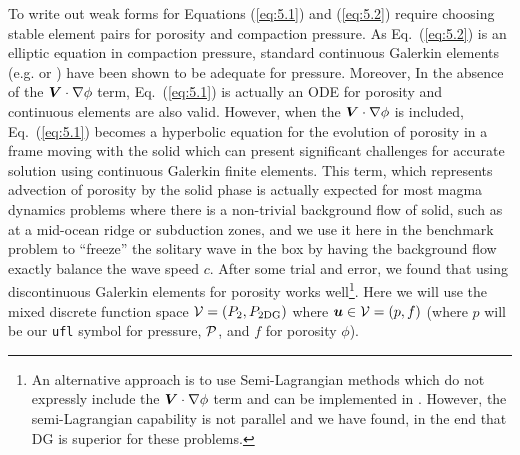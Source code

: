 To write out weak forms for Equations (\ref{eq:5.1}) and
(\ref{eq:5.2}) require choosing stable element pairs for porosity and
compaction pressure.  As Eq.\ (\ref{eq:5.2}) is an elliptic equation
in compaction pressure, standard continuous Galerkin elements (e.g. \Pone
or \Ptwo) have been shown to be adequate for pressure.  Moreover, In the
absence of the ${\mbox{\boldmath$V$}}\cdot\nabla\phi$ term, Eq.\ (\ref{eq:5.1}) is
actually an ODE for porosity and continuous elements are also valid.
However, when the ${\mbox{\boldmath$V$}}\cdot\nabla\phi$ is included, Eq.\ (\ref{eq:5.1})
becomes a hyperbolic equation for the evolution of porosity in a frame
moving with the solid which can present significant challenges for
accurate solution using continuous Galerkin finite elements.  This term, which
represents advection of porosity by the solid phase is actually
expected for most magma dynamics problems where there is a non-trivial
background flow of solid, such as at a mid-ocean ridge or subduction
zones, and we use it here in the benchmark problem to ``freeze'' the
solitary wave in the box by having the background flow exactly balance
the wave speed $c$.  After some trial and error, we found that using
discontinuous Galerkin elements for porosity works well\footnote{An
  alternative approach is to use Semi-Lagrangian methods which do not
  expressly include the ${\mbox{\boldmath$V$}}\cdot\nabla\phi$ term and can be
  implemented in \TF{}.  However, the semi-Lagrangian capability is
  not parallel and we have found, in the end that DG is superior for
  these problems.}.  Here we
will use the mixed discrete function space $\mathcal{V}=(P_2,P_{2\mathrm{DG}})$
where ${\mbox{\boldmath$u$}}\in\mathcal{V}=(p,f)$ (where $p$ will be our  \texttt{ufl}
symbol for pressure, $\mathcal{P}$, and $f$ for porosity $\phi$).

